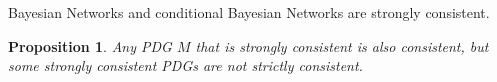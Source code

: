 \documentclass[letterpaper]{article} %
\theoremstyle{plain}
\newtheorem{prop}[theorem]{Proposition}
\theoremstyle{definition}
\theoremstyle{remark}
\begin{document}
{\begin{vleftovers}
	\begin{example}
		Bayesian Networks and conditional Bayesian Networks are strongly consistent.
	\end{example}

	\begin{prop}
		Any PDG $M$ that is strongly consistent is also consistent, but some strongly consistent PDGs are not strictly consistent.
	\end{prop}




	\end{vleftovers}
}
\end{document}
